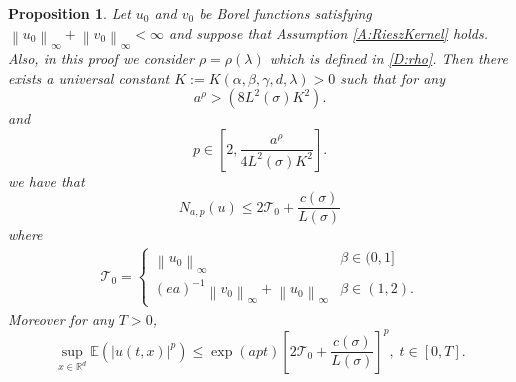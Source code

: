\documentclass[a4paper,11pt]{article}
\numberwithin{equation}{section}
\theoremstyle{plain}
\newtheorem{proposition}[theorem]{Proposition}
\theoremstyle{definition}
\newcommand{\Norm}[1]{\left\|  #1   \right\|}
\newcommand{\R}{\mathbb{R}}
\numberwithin{NQ}{section}
\numberwithin{LQ}{section}
\numberwithin{ZQ}{section}
\begin{document}
\begin{proposition}{\cite[Proposition 4.4]{millet.sanz-sole:21:global}} \label{P:Pmomubdd}
  Let $u_0$ and $v_0$ be Borel functions satisfying $\Norm{u_0}_\infty + \Norm{v_0}_\infty < \infty$
  and suppose that Assumption \ref{A:RieszKernel} holds. Also, in this proof we consider $\rho =
  \rho(\lambda)$ which is defined in \eqref{D:rho}. Then there exists a universal constant
  $K:=K(\alpha, \beta, \gamma,d, \lambda ) >0$ such that for any
	\[
	a^\rho > \left( 8 L^2(\sigma)K^2\right).
	\]
  and
	\[
	p \in \left[ 2, \frac{a^{\rho}}{4L^2(\sigma)K^2} \right].
	\]
  we have that
	\begin{equation}
	\label{E:ColorNbdd}
	N_{a,p}(u)  \le 2 \mathcal{T}_0 +  \frac{c(\sigma)}{L(\sigma)}
	\end{equation}
  where
	\begin{align*}
	\mathcal{T}_0 = \begin{cases}
		\Norm{u_0}_\infty                               & \beta \in (0,1] \\
    (ea)^{-1} \Norm{v_0}_\infty + \Norm{u_0}_\infty & \beta \in (1,2).
	\end{cases}
	\end{align*}
  Moreover for any $T>0$,
	\begin{equation} \label{E:ColorPMomBdd}
    \sup_{x\in\R^d} \mathbb{E}(|u(t,x)|^p) \le \exp\left( a p t  \right) \left[ 2 \mathcal{T}_0 + \frac{ c(\sigma) }{L(\sigma)} \right]^p, \; t\in[0,T].
	\end{equation}
\end{proposition}
\end{document}
